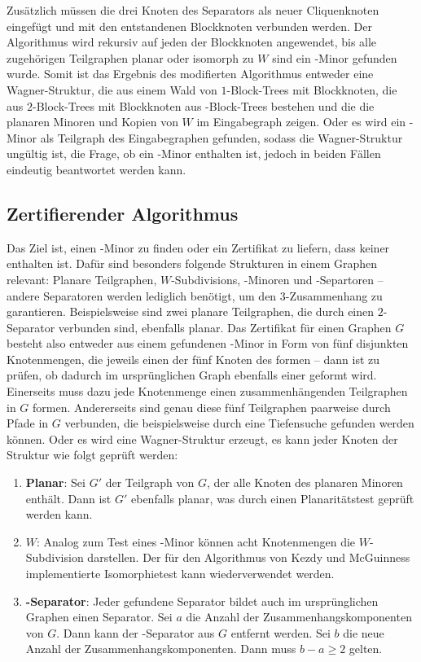 Zusätzlich müssen die drei Knoten des Separators als neuer Cliquenknoten eingefügt und mit den entstandenen Blockknoten verbunden werden.
Der Algorithmus wird rekursiv auf jeden der Blockknoten angewendet, bis alle zugehörigen Teilgraphen planar oder isomorph zu $W$ sind \bzw ein \kf-Minor gefunden wurde.
Somit ist das Ergebnis des modifierten Algorithmus entweder eine Wagner-Struktur, die aus einem Wald von $1$-Block-Trees mit Blockknoten, die aus $2$-Block-Trees mit Blockknoten aus \dd-Block-Trees bestehen und die die planaren Minoren und Kopien von $W$ im Eingabegraph zeigen.
Oder es wird ein \kf-Minor als Teilgraph des Eingabegraphen gefunden, sodass die Wagner-Struktur ungültig ist, die Frage, ob ein \kf-Minor enthalten ist, jedoch in beiden Fällen eindeutig beantwortet werden kann.

\subsection{Zertifierender Algorithmus}
Das Ziel ist, einen \kf-Minor zu finden oder ein Zertifikat zu liefern, dass keiner enthalten ist.
Dafür sind besonders folgende Strukturen in einem Graphen relevant: Planare Teilgraphen, $W$-Subdivisions, \kf-Minoren und \dd-Separtoren -- andere Separatoren werden lediglich benötigt, um den $3$-Zusammenhang zu garantieren.
Beispielsweise sind zwei planare Teilgraphen, die durch einen $2$-Separator verbunden sind, ebenfalls planar.
Das Zertifikat für einen Graphen $G$ besteht also entweder aus einem gefundenen \kf-Minor in Form von fünf disjunkten Knotenmengen, die jeweils einen der fünf Knoten des \kf formen -- dann ist zu prüfen, ob dadurch im ursprünglichen Graph ebenfalls einer geformt wird.
Einerseits muss dazu jede Knotenmenge einen zusammenhängenden Teilgraphen in $G$ formen.
Andererseits sind genau diese fünf Teilgraphen paarweise durch Pfade in $G$ verbunden, die beispielsweise durch eine Tiefensuche gefunden werden können.
Oder es wird eine Wagner-Struktur erzeugt, es kann jeder Knoten der Struktur wie folgt geprüft werden:
\begin{enumerate}
  \item \textbf{Planar}: Sei $G'$ der Teilgraph von $G$, der alle Knoten des planaren Minoren enthält.
        Dann ist $G'$ ebenfalls planar, was \zB durch einen Planaritätstest geprüft werden kann.
  \item \textbf{$W$}: Analog zum Test eines \kf-Minor können acht Knotenmengen die $W$-Subdivision darstellen.
        Der für den Algorithmus von Kezdy und McGuinness implementierte Isomorphietest kann wiederverwendet werden. %
  \item \textbf{\dd-Separator}: Jeder gefundene Separator bildet auch im ursprünglichen Graphen einen Separator.
        Sei $a$ die Anzahl der Zusammenhangskomponenten von $G$.
        Dann kann der \dd-Separator aus $G$ entfernt werden.
        Sei $b$ die neue Anzahl der Zusammenhangskomponenten.
        Dann muss $b - a \geq 2$ gelten.
\end{enumerate}
